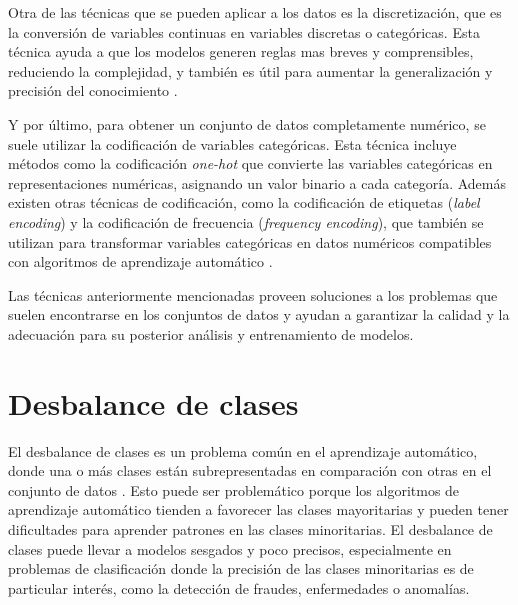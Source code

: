 Otra de las técnicas que se pueden aplicar a los datos es la discretización, que es la conversión de variables continuas en variables discretas o categóricas. Esta técnica ayuda a que los modelos generen reglas mas breves y comprensibles, reduciendo la complejidad, y también es útil para aumentar la generalización y precisión del conocimiento \citep{CAP2ARTICULO2}.

Y por último, para obtener un conjunto de datos completamente numérico, se suele utilizar la codificación de variables categóricas. Esta técnica incluye métodos como la codificación \textit{one-hot} que convierte las variables categóricas en representaciones numéricas, asignando un valor binario a cada categoría. Además existen otras técnicas de codificación, como la codificación de etiquetas (\textit{label encoding}) y la codificación de frecuencia (\textit{frequency encoding}), que también se utilizan para transformar variables categóricas en datos numéricos compatibles con algoritmos de aprendizaje automático \citep{CAP2ARTICULO3}.

Las técnicas anteriormente mencionadas proveen soluciones a los problemas que suelen encontrarse en los conjuntos de datos y ayudan a garantizar la calidad y la adecuación para su posterior análisis y entrenamiento de modelos.


\section{Desbalance de clases}

El desbalance de clases es un problema común en el aprendizaje automático, donde una o más clases están subrepresentadas en comparación con otras en el conjunto de datos \citep{CAP2ARTICULO4}. Esto puede ser problemático porque los algoritmos de aprendizaje automático tienden a favorecer las clases mayoritarias y pueden tener dificultades para aprender patrones en las clases minoritarias.
El desbalance de clases puede llevar a modelos sesgados y poco precisos, especialmente en problemas de clasificación donde la precisión de las clases minoritarias es de particular interés, como la detección de fraudes, enfermedades o anomalías.

